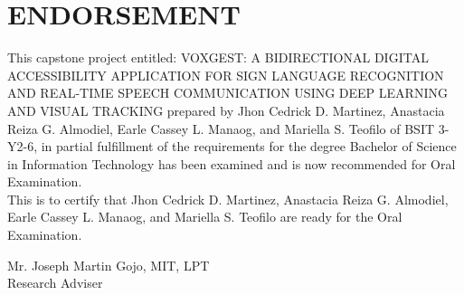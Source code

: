 \chapter*{ENDORSEMENT}

\pagestyle{plain}
\setcounter{page}{3}

\indent This capstone project entitled: VOXGEST: A BIDIRECTIONAL DIGITAL ACCESSIBILITY APPLICATION FOR SIGN LANGUAGE RECOGNITION AND REAL-TIME SPEECH COMMUNICATION USING DEEP LEARNING AND VISUAL TRACKING prepared by Jhon Cedrick D. Martinez, Anastacia Reiza G. Almodiel, Earle Cassey L. Manaog, and Mariella S. Teofilo of BSIT 3-Y2-6, in partial fulfillment of the requirements for the degree Bachelor of Science in Information Technology has been examined and is now recommended for Oral Examination. \\

This is to certify that Jhon Cedrick D. Martinez, Anastacia Reiza G. Almodiel, Earle Cassey L. Manaog, and Mariella S. Teofilo are ready for the Oral Examination.

\vspace{2em}
\begin{singlespace}
\begin{flushright}
    Mr. Joseph Martin Gojo, MIT, LPT \\
    Research Adviser
\end{flushright}
\end{singlespace}
\pagebreak{}
